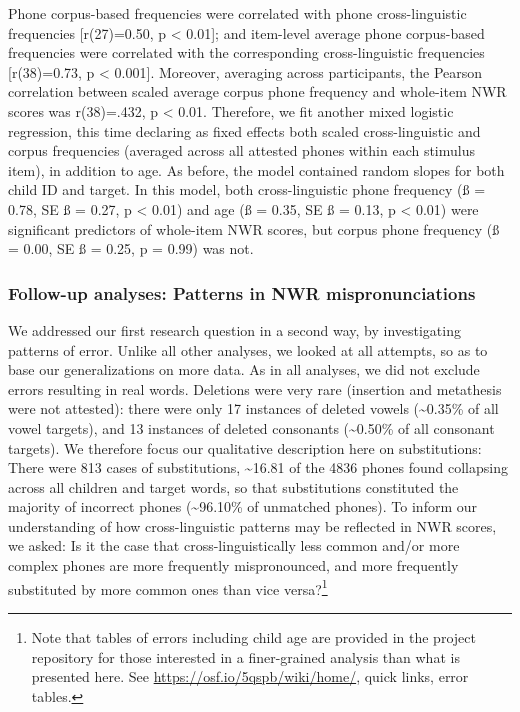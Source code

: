 \documentclass[
  american,
  ,man,floatsintext]{apa6}
\begin{document}
Phone corpus-based frequencies were correlated with phone cross-linguistic frequencies {[}r(27)=0.50, p \textless{} 0.01{]}; and item-level average phone corpus-based frequencies were correlated with the corresponding cross-linguistic frequencies {[}r(38)=0.73, p \textless{} 0.001{]}. Moreover, averaging across participants, the Pearson correlation between scaled average corpus phone frequency and whole-item NWR scores was r(38)=.432, p \textless{} 0.01. Therefore, we fit another mixed logistic regression, this time declaring as fixed effects both scaled cross-linguistic and corpus frequencies (averaged across all attested phones within each stimulus item), in addition to age. As before, the model contained random slopes for both child ID and target. In this model, both cross-linguistic phone frequency (ß = 0.78, SE ß = 0.27, p \textless{} 0.01) and age (ß = 0.35, SE ß = 0.13, p \textless{} 0.01) were significant predictors of whole-item NWR scores, but corpus phone frequency (ß = 0.00, SE ß = 0.25, p = 0.99) was not.

\hypertarget{follow-up-analyses-patterns-in-nwr-mispronunciations}{%
\subsubsection{Follow-up analyses: Patterns in NWR mispronunciations}\label{follow-up-analyses-patterns-in-nwr-mispronunciations}}

We addressed our first research question in a second way, by investigating patterns of error. Unlike all other analyses, we looked at all attempts, so as to base our generalizations on more data. As in all analyses, we did not exclude errors resulting in real words. Deletions were very rare (insertion and metathesis were not attested): there were only 17 instances of deleted vowels (\textasciitilde0.35\% of all vowel targets), and 13 instances of deleted consonants (\textasciitilde0.50\% of all consonant targets). We therefore focus our qualitative description here on substitutions: There were 813 cases of substitutions, \textasciitilde16.81 of the 4836 phones found collapsing across all children and target words, so that substitutions constituted the majority of incorrect phones (\textasciitilde96.10\% of unmatched phones). To inform our understanding of how cross-linguistic patterns may be reflected in NWR scores, we asked: Is it the case that cross-linguistically less common and/or more complex phones are more frequently mispronounced, and more frequently substituted by more common ones than vice versa?\footnote{Note that tables of errors including child age are provided in the project repository for those interested in a finer-grained analysis than what is presented here. See \url{https://osf.io/5qspb/wiki/home/}, quick links, error tables.}
\end{document}
